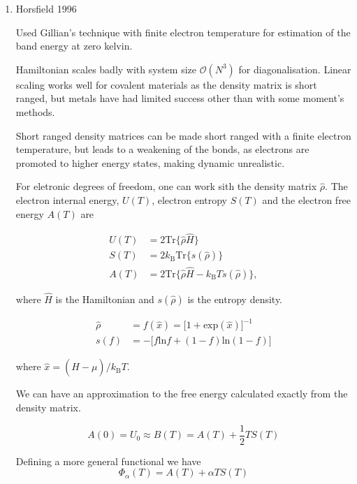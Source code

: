 \documentclass[11pt]{article}
\begin{document}
\begin{enumerate}
\begin{enumerate}
\item Horsfield 1996
\label{sec:org8707f1e}
\cite{Horsfield1996}

Used Gillian's technique \cite{Gillan1989} with finite electron temperature for estimation of
the band energy at zero kelvin. 


Hamiltonian scales badly with system size \(\mathcal{O}(N^3)\) for
diagonalisation. Linear scaling works well for covalent materials as the
density matrix is short ranged, but metals have had limited success other than
with some moment's methods.

Short ranged density matrices can be made short ranged with a finite electron
temperature, but leads to a weakening of the bonds, as electrons are promoted
to higher energy states, making dynamic unrealistic. 

For eletronic degrees of freedom, one can work sith the density matrix
\(\hat{\rho}\). The electron internal energy, \(U(T)\), electron entropy \(S(T)\)
and the electron free energy \(A(T)\) are 

\begin{LaTeX}
\begin{align}
U(T) &= 2 \text{Tr}\{ \hat{\rho} \hat{H} \} \\
S(T) &= 2 k_{\text{B}} \text{Tr}\{ s( \hat{\rho} ) \} \\
A(T) &= 2 \text{Tr}\{ \hat{\rho} \hat{H} - k_{\text{B}} T s( \hat{\rho} ) \},
\end{align}
\end{LaTeX}

where \(\hat{H}\) is the Hamiltonian and \(s(\hat{\rho})\) is the entropy density.

\begin{LaTeX}
\begin{align}
\hat{\rho} &= f(\hat{x}) = \big[ 1 + \text{exp}(\hat{x}) \big]^{-1} \\
s(f) &= - \big[ f\text{ln}f + (1-f)\text{ln}(1-f) \big] 
\end{align}
\end{LaTeX}

where \(\hat{x} = ( \hat{H} - \mu )/k_{\text{B}} T\).

We can have an approximation to the free energy calculated exactly from the
density matrix.

\[
A(0) = U_{0} \approx B(T) = A(T) + \frac{1}{2} T S(T)
\]

Defining a more general functional we have 
\[
\Phi_{\alpha}(T) = A(T) + \alpha T S(T)
\]


\end{enumerate}
\end{enumerate}
\end{document}
